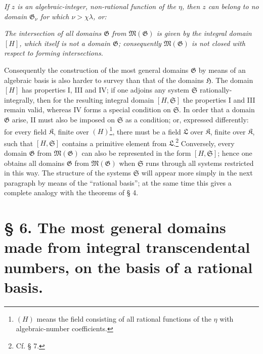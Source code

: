 \documentclass[11pt]{article}
\begin{document}
\emph{If $z$ is an algebraic-integer, non-rational function of the $\eta$, then
$z$ can belong to no domain $\mathfrak G_\nu$ for which
$\nu>\chi\lambda$, or:}

\emph{The intersection of all domains $\mathfrak G$ from
$\mathfrak M(\mathfrak G)$ is given by the integral domain $[H]$, which itself
is not a domain $\mathfrak G$; consequently $\mathfrak M(\mathfrak G)$ is not
closed with respect to forming intersections.}

Consequently the construction of the most general domains $\mathfrak G$ by means
of an algebraic basis is also harder to survey than that of the domains
$\mathfrak H$. The domain $[H]$ has properties I, III and IV; if one adjoins any
system $\mathfrak S$ rationally-integrally, then for the resulting integral
domain $[H,\mathfrak S]$ the properties I and III remain valid, whereas IV forms
a special condition on $\mathfrak S$. In order that a domain $\mathfrak G$
arise, II must also be imposed on $\mathfrak S$ as a condition; or, expressed
differently: for every field $\mathfrak K$, finite over $(H)$\footnote{$(H)$
means the field consisting of all rational functions of the $\eta$ with
algebraic-number coefficients.}, there must be a field $\mathfrak L$ over
$\mathfrak K$, finite over $\mathfrak K$, such that $[H,\mathfrak S]$ contains a
primitive element from $\mathfrak L$.\footnote{Cf. § 7.} Conversely, every domain
$\mathfrak G$ from $\mathfrak M(\mathfrak G)$ can also be represented in the
form $[H,\mathfrak S]$; hence one obtains all domains $\mathfrak G$ from
$\mathfrak M(\mathfrak G)$ when $\mathfrak S$ runs through all systems
restricted in this way. The structure of the systems $\mathfrak S$ will appear
more simply in the next paragraph by means of the ``rational basis''; at the same
time this gives a complete analogy with the theorems of § 4.

\section*{§ 6. The most general domains made from integral transcendental numbers, on the basis of a rational basis.}
\end{document}
